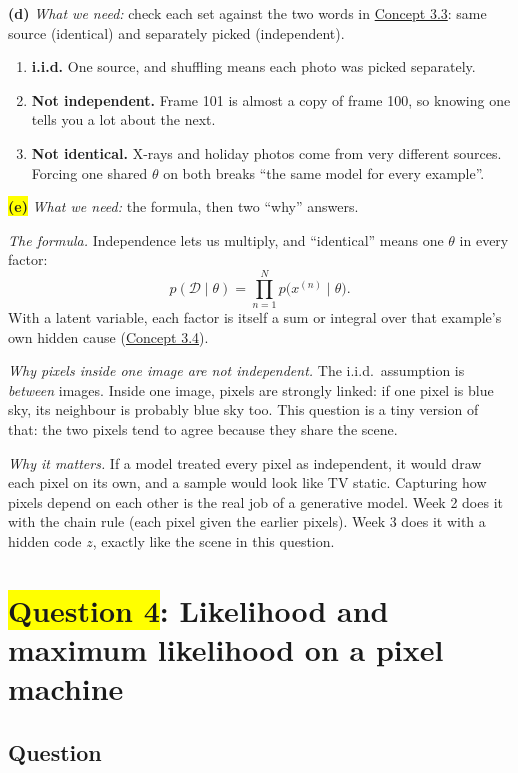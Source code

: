 \documentclass[12pt,a4paper]{article}
\begin{document}
\textbf{(d)} \emph{What we need:} check each set against the two words in \hyperref[c3-3]{Concept 3.3}: same source (identical) and separately picked (independent).
\begin{enumerate}[label=(\roman*),nosep]
  \item \textbf{i.i.d.} One source, and shuffling means each photo was picked separately.
  \item \textbf{Not independent.} Frame 101 is almost a copy of frame 100, so knowing one tells you a lot about the next.
  \item \textbf{Not identical.} X-rays and holiday photos come from very different sources. Forcing one shared $\theta$ on both breaks ``the same model for every example''.
\end{enumerate}

\colorbox{yellow}{\textbf{(e)}} \emph{What we need:} the formula, then two ``why'' answers.

\emph{The formula.} Independence lets us multiply, and ``identical'' means one $\theta$ in every factor:
\[
p(\mathcal{D}\mid\theta)=\prod_{n=1}^{N}p\big(x^{(n)}\mid\theta\big).
\]
With a latent variable, each factor is itself a sum or integral over that example's own hidden cause (\hyperref[c3-4]{Concept 3.4}).

\emph{Why pixels inside one image are not independent.} The i.i.d.\ assumption is \emph{between} images. Inside one image, pixels are strongly linked: if one pixel is blue sky, its neighbour is probably blue sky too. This question is a tiny version of that: the two pixels tend to agree because they share the scene.

\emph{Why it matters.} If a model treated every pixel as independent, it would draw each pixel on its own, and a sample would look like TV static. Capturing how pixels depend on each other is the real job of a generative model. Week 2 does it with the chain rule (each pixel given the earlier pixels). Week 3 does it with a hidden code $z$, exactly like the scene in this question.
\newpage
\section{\texorpdfstring{\colorbox{yellow}{Question 4}}{Question 4}: Likelihood and maximum likelihood on a pixel machine}

\subsection{Question}
\end{document}
